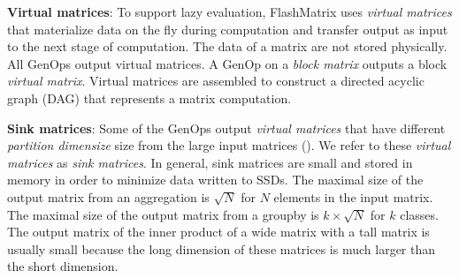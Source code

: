 \noindent \textbf{Virtual matrices}:
To support lazy evaluation, FlashMatrix uses \textit{virtual matrices} that
materialize data on the fly during computation and transfer output as input to the
next stage of computation.  The data of a matrix are not stored physically.
All GenOps output virtual matrices. A GenOp on a \textit{block matrix} outputs
a block \textit{virtual matrix}. Virtual matrices are assembled to construct
a directed acyclic graph (DAG) that represents a matrix computation.

\noindent \textbf{Sink matrices}: Some of the GenOps output \textit{virtual
matrices} that have different \textit{partition dimensize} size from
the large input matrices (). We refer to these
\textit{virtual matrices} as \textit{sink matrices}. %
In general, sink matrices are small and stored in memory in order to minimize
data written to SSDs. The maximal size of the output matrix from an aggregation
is $\sqrt{N}$ for $N$ elements in the input matrix. The maximal size of
the output matrix from a groupby is $k \times \sqrt{N}$ for $k$ classes.
The output matrix of the inner product of a wide matrix with a tall matrix is usually small because
the long dimension of these matrices is much larger than the short dimension.

